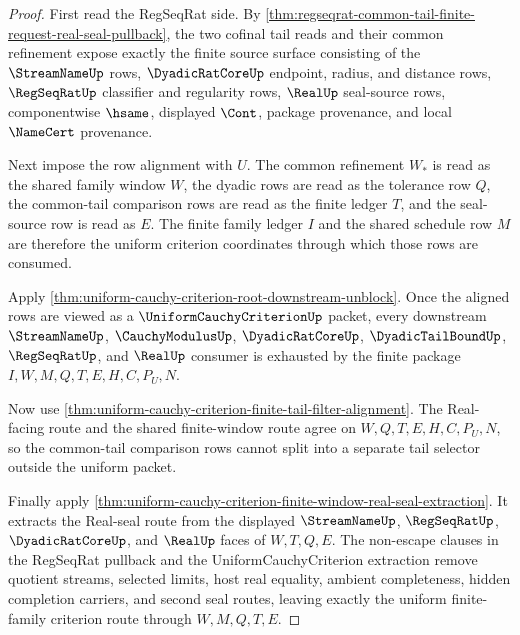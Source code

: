 \begin{proof}
First read the RegSeqRat side. By \autoref{thm:regseqrat-common-tail-finite-request-real-seal-pullback}, the two cofinal tail reads and their common refinement expose exactly the finite source surface consisting of the $\StreamNameUp$ rows, $\DyadicRatCoreUp$ endpoint, radius, and distance rows, $\RegSeqRatUp$ classifier and regularity rows, $\RealUp$ seal-source rows, componentwise $\hsame$, displayed $\Cont$, package provenance, and local $\NameCert$ provenance.

Next impose the row alignment with $U$. The common refinement $W_\ast$ is read as the shared family window $W$, the dyadic rows are read as the tolerance row $Q$, the common-tail comparison rows are read as the finite ledger $T$, and the seal-source row is read as $E$. The finite family ledger $I$ and the shared schedule row $M$ are therefore the uniform criterion coordinates through which those rows are consumed.

Apply \autoref{thm:uniform-cauchy-criterion-root-downstream-unblock}. Once the aligned rows are viewed as a $\UniformCauchyCriterionUp$ packet, every downstream $\StreamNameUp$, $\CauchyModulusUp$, $\DyadicRatCoreUp$, $\DyadicTailBoundUp$, $\RegSeqRatUp$, and $\RealUp$ consumer is exhausted by the finite package $I,W,M,Q,T,E,H,C,P_U,N$.

Now use \autoref{thm:uniform-cauchy-criterion-finite-tail-filter-alignment}. The Real-facing route and the shared finite-window route agree on $W,Q,T,E,H,C,P_U,N$, so the common-tail comparison rows cannot split into a separate tail selector outside the uniform packet.

Finally apply \autoref{thm:uniform-cauchy-criterion-finite-window-real-seal-extraction}. It extracts the Real-seal route from the displayed $\StreamNameUp$, $\RegSeqRatUp$, $\DyadicRatCoreUp$, and $\RealUp$ faces of $W,T,Q,E$. The non-escape clauses in the RegSeqRat pullback and the UniformCauchyCriterion extraction remove quotient streams, selected limits, host real equality, ambient completeness, hidden completion carriers, and second seal routes, leaving exactly the uniform finite-family criterion route through $W,M,Q,T,E$.
\end{proof}

